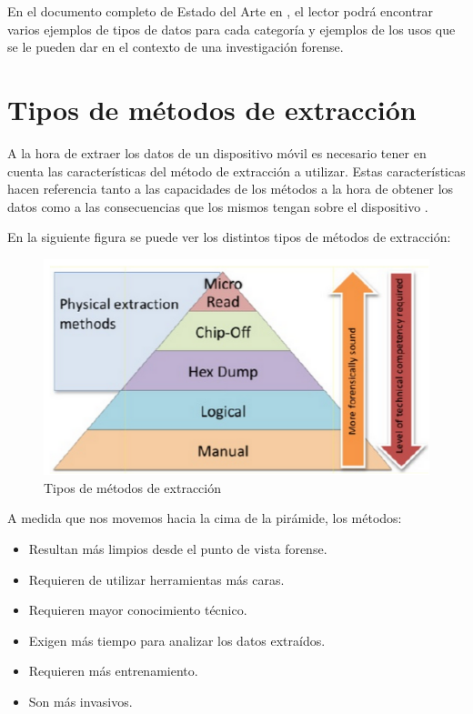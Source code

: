 En el documento completo de Estado del Arte en \cite{estadoDelArte}, el lector podrá encontrar varios ejemplos de tipos de datos para cada categoría y ejemplos de los usos que se le pueden dar en el contexto de una investigación forense.

\section{Tipos de métodos de extracción}
\label{tiposDeMetodosExtraccion}

A la hora de extraer los datos de un dispositivo móvil es necesario tener en cuenta las características del método de extracción a utilizar. Estas características hacen referencia tanto a las capacidades de los métodos a la hora de obtener los datos como a las consecuencias que los mismos tengan sobre el dispositivo \cite{cellphoneevidence}.

En la siguiente figura se puede ver los distintos tipos de métodos de extracción:

\begin{figure}[H]
    \begin{center}
        \includegraphics[width=\textwidth]{figures/extraction_methods_types}
        \caption{Tipos de métodos de extracción \cite{extractionMethodsPyramid}}
    \end{center}
\end{figure}

A medida que nos movemos hacia la cima de la pirámide, los métodos:

\begin{itemize}
\item Resultan más limpios desde el punto de vista forense.
\item Requieren de utilizar herramientas más caras.
\item Requieren mayor conocimiento técnico.
\item Exigen más tiempo para analizar los datos extraídos.
\item Requieren más entrenamiento.
\item Son más invasivos.
\end{itemize}

